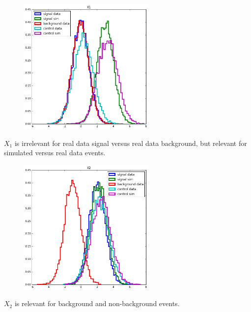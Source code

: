 \documentclass{beamer}
\begin{document}
\begin{frame}

\begin{figure}
\centering
\includegraphics[width=0.6\textwidth]{figures/x1.png}
\end{figure}

$X_1$ is {\color{red} irrelevant} for real data signal versus real data
background, but relevant for simulated versus real data events.

\end{frame}


\begin{frame}

\begin{figure}
\centering
\includegraphics[width=0.6\textwidth]{figures/x2.png}
\end{figure}

$X_2$ is {\color{blue} relevant} for  background and non-background events.

\end{frame}
\end{document}
